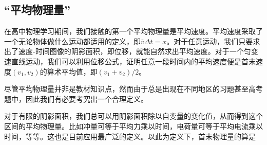 \subsection{“平均物理量”}
在高中物理学习期间，我们接触的第一个平均物理量是平均速度。平均速度采取了一个无论物体做什么运动都适用的定义，即$\bar v\Delta t=x$。对于任意运动，我们只要求出了速度-时间图像的阴影面积，即位移，就能自然求出平均速度。对于一个匀变速直线运动，我们可以利用位移公式，证明任意一段时间内的平均速度便是首末速度$(v_1,v_2)$的算术平均值，即$(v_1+v_2)/2$。

尽管平均物理量并非是教材知识点，然而由于总是出现在不同地区的习题甚至高考题中，因此我们有必要考究出一个合理定义。

对于有限的阴影面积，我们总可以用阴影面积除以自变量的变化值，从而得到这个区间的平均物理量。比如冲量可等于平均力乘以时间，电荷量可等于平均电流乘以时间，等等。这也是目前应用最广泛的定义。以此为定义下，首末物理量的算是